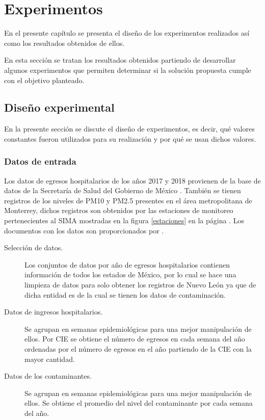 \chapter{Experimentos}

En el presente capítulo se presenta el diseño de los experimentos realizados así como los resultados obtenidos de ellos.

En esta sección se tratan los resultados obtenidos partiendo de desarrollar algunos experimentos que permiten determinar si la solución propuesta cumple con el objetivo planteado.

\section{Diseño experimental}
En la presente sección se discute el diseño de experimentos, es decir, qué valores constantes fueron utilizados para su realización y por qué se usan dichos valores.

\subsection{Datos de entrada}
Los datos de egresos hospitalarios de los años 2017 y 2018 provienen de la base de datos de la Secretaría de Salud del Gobierno de México \cite{f1}. También se tienen registros de los niveles de PM10 y PM2.5 presentes en el área metropolitana de Monterrey, dichos registros son obtenidos por las estaciones de monitoreo pertenecientes al SIMA \cite{f2} mostradas en la figura \ref{estaciones} en la página \pageref{estaciones}. Los documentos con los datos son proporcionados por \citet{f3}.

\begin{description}
\item [Selección de datos.] {Los conjuntos de datos por año de egresos hospitalarios contienen información de todos los estados de México, por lo cual se hace una limpieza de datos para solo obtener los registros de Nuevo León ya que de dicha entidad es de la cual se tienen los datos de contaminación.}
\item [Datos de ingresos hospitalarios.] {Se agrupan en semanas epidemiológicas para una mejor manipulación de ellos. Por CIE se obtiene el número de egresos en cada semana del año ordenadas por el número de egresos en el año partiendo de la CIE con la mayor cantidad.}
\item [Datos de los contaminantes.] {Se agrupan en semanas epidemiológicas para una mejor manipulación de ellos. Se obtiene el promedio del nivel del contaminante por cada semana del año.}
\end{description}


